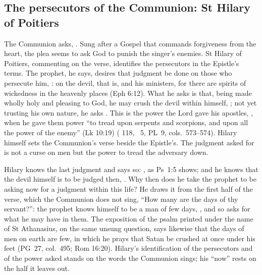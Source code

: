 \subsection{The persecutors of the Communion: St Hilary of Poitiers}

The Communion asks, . Sung after a Gospel that commands forgiveness from the heart,
the plea seems to ask God to punish the singer's enemies. St Hilary of Poitiers,
commenting on the verse, identifies the persecutors in the Epistle's terms. The
prophet, he says, desires that judgment be done on those who persecute him,
: on the devil, that is, and his ministers, for there are spirits of
wickedness in the heavenly places (Eph 6:12). What he asks is that, being made
wholly holy and pleasing to God, he may crush the devil within himself,
; not yet trusting his
own nature, he asks . This is the power the Lord gave his apostles, , when he gave them power ``to tread upon serpents
and scorpions, and upon all the power of the enemy'' (Lk 10:19)
( 118, ~5, PL~9, cols.~573--574). Hilary
himself sets the Communion's verse beside the Epistle's. The judgment asked for
is not a curse on men but the power to tread the adversary down.

Hilary knows the last judgment and says so: , as Ps~1:5 shows; and he knows that the devil
himself is to be judged then, . Why then does he take the prophet to be asking now for a
judgment within this life? He draws it from the first half of the verse, which
the Communion does not sing, ``How many are the days of thy servant?'': the
prophet knows himself to be a man of few days, , and so asks for what he may have in them.
The exposition of the psalm printed under the name of St Athanasius, on the same
unsung question, says likewise that the days of men on earth are few, in which
he prays that Satan be crushed at once under his feet (PG~27, col.~495; Rom
16:20). Hilary's identification of the persecutors and of the power asked stands
on the words the Communion sings; his ``now'' rests on the half it leaves out.

